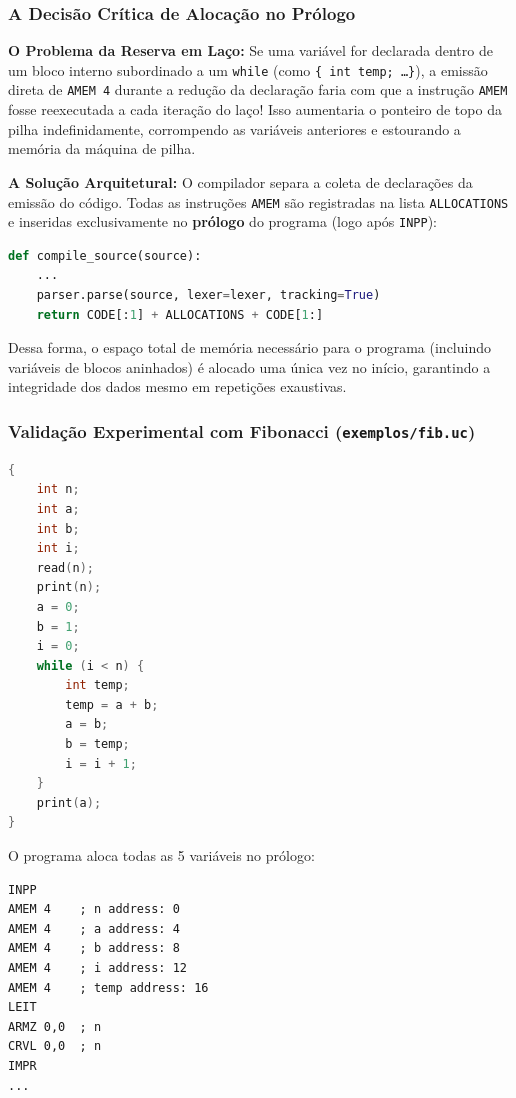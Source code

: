 \documentclass[12pt,a4paper]{article}
\begin{document}
\subsubsection{A Decisão Crítica de Alocação no Prólogo}

\noindent\textbf{O Problema da Reserva em Laço:} Se uma variável for declarada dentro
de um bloco interno subordinado a um \texttt{while} (como \texttt{\{ int temp; \dots \}}),
a emissão direta de \texttt{AMEM 4} durante a redução da declaração faria com que a
instrução \texttt{AMEM} fosse reexecutada a cada iteração do laço! Isso aumentaria
o ponteiro de topo da pilha indefinidamente, corrompendo as variáveis anteriores e
estourando a memória da máquina de pilha.

\noindent\textbf{A Solução Arquitetural:} O compilador separa a coleta de declarações
da emissão do código. Todas as instruções \texttt{AMEM} são registradas na lista
\texttt{ALLOCATIONS} e inseridas exclusivamente no \textbf{prólogo} do programa
(logo após \texttt{INPP}):
\begin{lstlisting}[language=Python]
def compile_source(source):
    ...
    parser.parse(source, lexer=lexer, tracking=True)
    return CODE[:1] + ALLOCATIONS + CODE[1:]
\end{lstlisting}
Dessa forma, o espaço total de memória necessário para o programa (incluindo variáveis
de blocos aninhados) é alocado uma única vez no início, garantindo a integridade dos
dados mesmo em repetições exaustivas.

\subsubsection{Validação Experimental com Fibonacci (\texttt{exemplos/fib.uc})}

\begin{lstlisting}[language=C]
{
    int n;
    int a;
    int b;
    int i;
    read(n);
    print(n);
    a = 0;
    b = 1;
    i = 0;
    while (i < n) {
        int temp;
        temp = a + b;
        a = b;
        b = temp;
        i = i + 1;
    }
    print(a);
}
\end{lstlisting}

\noindent O programa aloca todas as 5 variáveis no prólogo:
\begin{lstlisting}
INPP
AMEM 4    ; n address: 0
AMEM 4    ; a address: 4
AMEM 4    ; b address: 8
AMEM 4    ; i address: 12
AMEM 4    ; temp address: 16
LEIT
ARMZ 0,0  ; n
CRVL 0,0  ; n
IMPR
...
\end{lstlisting}
\end{document}
